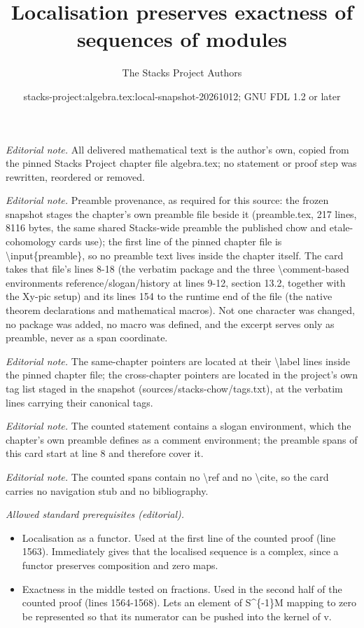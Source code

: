 \documentclass[10pt,a4paper]{amsart}
\title{Localisation preserves exactness of sequences of modules}
\author{The Stacks Project Authors}
\date{stacks-project:algebra.tex:local-snapshot-20261012; GNU FDL 1.2 or later}
\theoremstyle{plain}
\theoremstyle{definition}
\theoremstyle{remark}
\numberwithin{equation}{subsection}
\begin{document}
\maketitle
\noindent\textit{Editorial note.} All delivered mathematical text is the author's own, copied from the pinned Stacks Project chapter file algebra.tex; no statement or proof step was rewritten, reordered or removed.\par\medskip
\noindent\textit{Editorial note.} Preamble provenance, as required for this source: the frozen snapshot stages the chapter's own preamble file beside it (preamble.tex, 217 lines, 8116 bytes, the same shared Stacks-wide preamble the published chow and etale-cohomology cards use); the first line of the pinned chapter file is \textbackslash{}input\{preamble\}, so no preamble text lives inside the chapter itself. The card takes that file's lines 8-18 (the verbatim package and the three \textbackslash{}comment-based environments reference/slogan/history at lines 9-12, section 13.2, together with the Xy-pic setup) and its lines 154 to the runtime end of the file (the native theorem declarations and mathematical macros). Not one character was changed, no package was added, no macro was defined, and the excerpt serves only as preamble, never as a span coordinate.\par\medskip
\noindent\textit{Editorial note.} The same-chapter pointers are located at their \textbackslash{}label lines inside the pinned chapter file; the cross-chapter pointers are located in the project's own tag list staged in the snapshot (sources/stacks-chow/tags.txt), at the verbatim lines carrying their canonical tags.\par\medskip
\noindent\textit{Editorial note.} The counted statement contains a slogan environment, which the chapter's own preamble defines as a comment environment; the preamble spans of this card start at line 8 and therefore cover it.\par\medskip
\noindent\textit{Editorial note.} The counted spans contain no \textbackslash{}ref and no \textbackslash{}cite, so the card carries no navigation stub and no bibliography.\par\medskip
\noindent\textit{Allowed standard prerequisites (editorial).}\begin{itemize}
\item Localisation as a functor. Used at the first line of the counted proof (line 1563). Immediately gives that the localised sequence is a complex, since a functor preserves composition and zero maps.
\item Exactness in the middle tested on fractions. Used in the second half of the counted proof (lines 1564-1568). Lets an element of S\textasciicircum{}\{-1\}M mapping to zero be represented so that its numerator can be pushed into the kernel of v.
\end{itemize}\medskip
\end{document}
